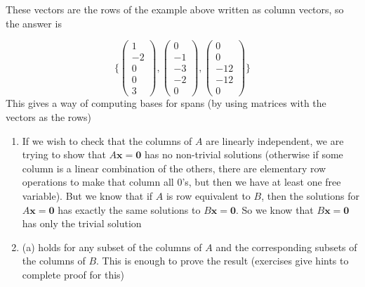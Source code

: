 \documentclass{report}
\begin{document}
{\begin{center}
\end{center}
These vectors are the rows of the example above written as column vectors, so the answer is 
\begin{center}
\[
    \bigg \{ \begin{pmatrix} 1 \\ -2 \\ 0 \\ 0 \\ 3 \end{pmatrix}, \begin{pmatrix} 0 \\ -1 \\ -3 \\ -2 \\ 0 \end{pmatrix}, \begin{pmatrix} 0 \\ 0 \\ -12 \\ -12 \\ 0 \end{pmatrix}     \bigg \}
\]
This gives a way of computing bases for spans (by using matrices with the vectors as the rows)
\end{center}
}


\begin{myproof}
    \begin{enumerate}
        \item If we wish to check that the columns of $A$ are linearly independent, we are trying to show that  $A \mathbf{x} = \mathbf{0}$ has no non-trivial solutions (otherwise if some column is a linear combination of the others, there are elementary row operations to make that column all 0's, but then we have at least one free variable). But we know that if $A$ is row equivalent to  $B$, then the solutions for  $A \mathbf{x} = \mathbf{0}$ has exactly the same solutions to $B \mathbf{x} = \mathbf{0}$. So we know that $B \mathbf{x} = \mathbf{0}$ has only the trivial solution
        \item (a) holds for any subset of the columns of $A$ and the corresponding subsets of the columns of  $B$. This is enough to prove the result (exercises give hints to complete proof for this)
    \end{enumerate}
\end{myproof}
\end{document}
